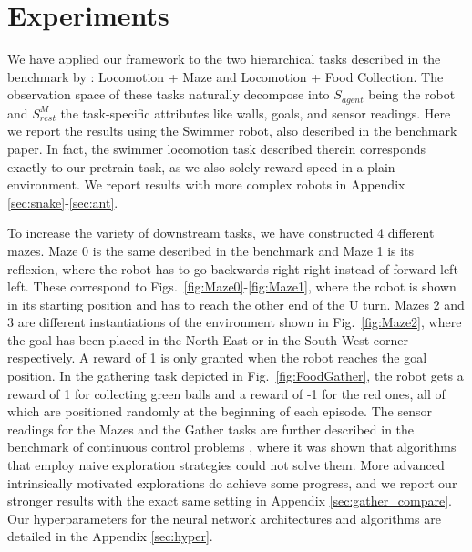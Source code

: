 \documentclass{article} %
\begin{document}


\section{Experiments}
\label{sec:experiments}
We have applied our framework to the two hierarchical tasks described in the benchmark by \cite{duan2016benchmarking}: Locomotion + Maze and Locomotion + Food Collection. The observation space of these tasks naturally decompose into $S_{agent}$ being the robot and $S_{rest}^M$ the task-specific attributes like walls, goals, and sensor readings. Here we report the results using the Swimmer robot, also described in the benchmark paper. In fact, the swimmer locomotion task described therein corresponds exactly to our pretrain task, as we also solely reward speed in a plain environment. We report results with more complex robots in Appendix \ref{sec:snake}-\ref{sec:ant}.

To increase the variety of downstream tasks, we have constructed 4 different mazes. Maze 0 is the same described in the benchmark \citep{duan2016benchmarking} and Maze 1 is its reflexion, where the robot has to go backwards-right-right instead of forward-left-left. These correspond to  Figs.\ \ref{fig:Maze0}-\ref{fig:Maze1}, where the robot is shown in its starting position and has to reach the other end of the U turn. Mazes 2 and 3 are different instantiations of the environment shown in Fig.\ \ref{fig:Maze2}, where the goal has been placed in the North-East or in the South-West corner respectively. A reward of 1 is only granted when the robot reaches the goal position. In the gathering task depicted in Fig.\ \ref{fig:FoodGather}, the robot gets a reward of 1 for collecting green balls and a reward of -1 for the red ones, all of which are positioned randomly at the beginning of each episode. The sensor readings for the Mazes and the Gather tasks are further described in the benchmark of continuous control problems \citep{duan2016benchmarking}, where it was shown that algorithms that employ naive exploration strategies could not solve them. More advanced intrinsically motivated explorations \citep{houthooft2016variational} do achieve some progress, and we report our stronger results with the exact same setting in Appendix \ref{sec:gather_compare}. Our hyperparameters for the neural network architectures and algorithms are detailed in the Appendix \ref{sec:hyper}.
\end{document}

